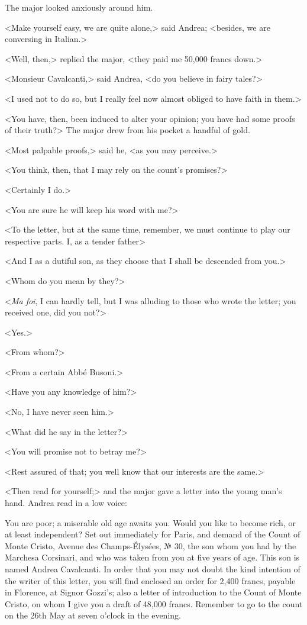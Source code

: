  The major looked anxiously around him. 

 <Make yourself easy, we are quite alone,> said Andrea; <besides, we are conversing in Italian.> 

 <Well, then,> replied the major, <they paid me 50,000 francs down.> 

 <Monsieur Cavalcanti,> said Andrea, <do you believe in fairy tales?> 

 <I used not to do so, but I really feel now almost obliged to have faith in them.> 

 <You have, then, been induced to alter your opinion; you have had some proofs of their truth?> The major drew from his pocket a handful of gold. 

 <Most palpable proofs,> said he, <as you may perceive.> 

 <You think, then, that I may rely on the count's promises?> 

 <Certainly I do.> 

 <You are sure he will keep his word with me?> 

 <To the letter, but at the same time, remember, we must continue to play our respective parts. I, as a tender father\longdash> 

 <And I as a dutiful son, as they choose that I shall be descended from you.> 

 <Whom do you mean by they?> 

 <\textit{Ma foi}, I can hardly tell, but I was alluding to those who wrote the letter; you received one, did you not?> 

 <Yes.> 

 <From whom?> 

 <From a certain Abbé Busoni.> 

 <Have you any knowledge of him?> 

 <No, I have never seen him.> 

 <What did he say in the letter?> 

 <You will promise not to betray me?> 

 <Rest assured of that; you well know that our interests are the same.> 

 <Then read for yourself;> and the major gave a letter into the young man's hand. Andrea read in a low voice:  
 
 \begin{mail}{}{}
 You are poor; a miserable old age awaits you. Would you like to become rich, or at least independent? Set out immediately for Paris, and demand of the Count of Monte Cristo, Avenue des Champs-Élysées, № 30, the son whom you had by the Marchesa Corsinari, and who was taken from you at five years of age. This son is named Andrea Cavalcanti. In order that you may not doubt the kind intention of the writer of this letter, you will find enclosed an order for 2,400 francs, payable in Florence, at Signor Gozzi's; also a letter of introduction to the Count of Monte Cristo, on whom I give you a draft of 48,000 francs. Remember to go to the count on the 26th May at seven o'clock in the evening.  
 
 \end{mail}

